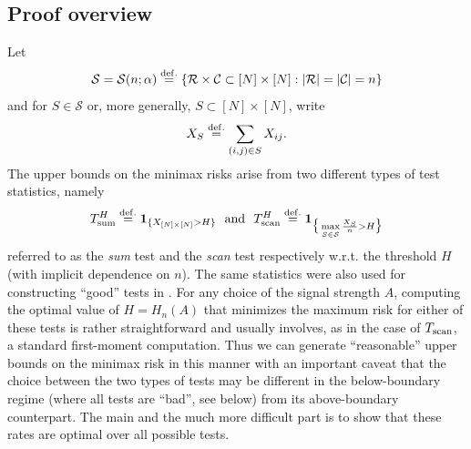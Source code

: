 \documentclass[11pt,reqno,letterpaper]{amsart}
\numberwithin{equation}{section}
\theoremstyle{plain}
\def \cR {\mathcal{R}}
\def \cC {\mathcal{C}}
\begin{document}
\subsection{Proof overview}\label{subsec:overview}
Let
\begin{equation}\label{def:Sfamily}
\mathcal S = \mathcal S(n; \alpha) \stackrel{{\rm def.}}{=}
\{\cR\times\cC\subset[N]\times[N]: |\cR|=|\cC|=n\}
\end{equation}
and for $S\in\mathcal S$ or, more generally, $S \subset [N] \times [N]$, write
\begin{equation}\label{def:XS}
X_S\stackrel{{\rm def.}}{=}\sum_{(i,j)\in S}X_{ij}.    
\end{equation}
The upper bounds on the minimax risks arise from two different types of test statistics, namely 
\begin{equation}\label{def:sumscantest}
T_{{\rm sum}}^H  \stackrel{{\rm def.}}{=} \mathbf{1}_{\{X_{[N]\times[N]} > H\}} \,\, \mbox{ and } \,\, T_{{\rm scan}}^H \stackrel{{\rm def.}}{=} \mathbf{1}_{\big\{\max\limits_{S\in \mathcal{S}} \frac{X_{S}}n > H \big\}}
\end{equation}
referred to as the {\em sum} test and the {\em scan} test respectively w.r.t. the threshold $H$ (with implicit dependence on $n$). The same statistics were also used 
for constructing ``good'' tests in \cite{butuceasubmatrix2013}. For any choice of 
the signal strength $A$, computing the optimal value of $H = H_n(A)$ that minimizes the maximum risk for either of 
these tests is rather straightforward and usually involves, as in the case of $T_{{\rm scan}}$, a standard first-moment 
computation. Thus we can generate ``reasonable'' upper bounds on the minimax risk in this manner with an important caveat that the choice between the two types of tests 
may be different in the below-boundary regime (where all tests are ``bad'', see below) from its above-boundary counterpart. The main and the much more difficult 
part is to show that these rates are optimal over all possible tests.

\vspace{0.15cm}
\end{document}
